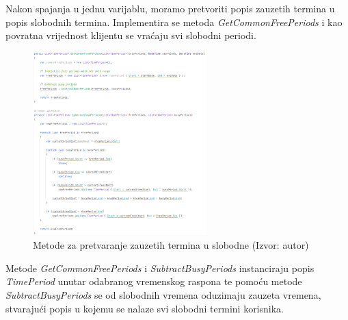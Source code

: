 \documentclass{foi}
\begin{document}
Nakon spajanja u jednu varijablu, moramo pretvoriti popis zauzetih termina u popis slobodnih termina. Implementira se metoda \textit{GetCommonFreePeriods} i kao povratna vrijednost klijentu se vraćaju svi slobodni periodi.
\begin{figure}[H]
    \centering
    \includegraphics[width=0.6\textwidth]{slike/FreePeriods.png}
    \caption{Metode za pretvaranje zauzetih termina u slobodne (Izvor: autor)}
    \label{fig:FreePeriods}
\end{figure}
Metode \textit{GetCommonFreePeriods} i \textit{SubtractBusyPeriods} instanciraju popis \textit{TimePeriod} unutar odabranog vremenskog raspona te pomoću metode \textit{SubtractBusyPeriods} se od slobodnih vremena oduzimaju zauzeta vremena, stvarajući popis u kojemu se nalaze svi slobodni termini korisnika.
\end{document}
